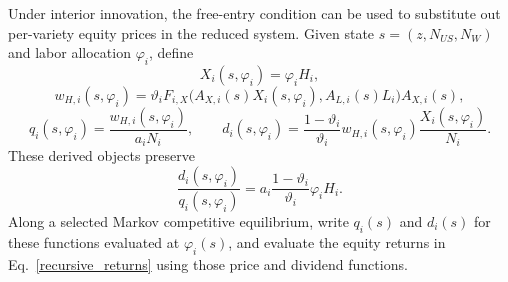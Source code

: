 \documentclass{article}
\begin{document}
Under interior innovation, the free-entry condition can be used to substitute out per-variety equity prices in the reduced system. Given state $s=(z,N_{US},N_W)$ and labor allocation $\varphi_i$, define
\[
X_i(s,\varphi_i)=\varphi_iH_i,
\]
\[
w_{H,i}(s,\varphi_i)
=
\vartheta_i
F_{i,X}
\bigl(A_{X,i}(s)X_i(s,\varphi_i),A_{L,i}(s)L_i\bigr)
A_{X,i}(s),
\]
\[
q_i(s,\varphi_i)=\frac{w_{H,i}(s,\varphi_i)}{a_iN_i},
\qquad
d_i(s,\varphi_i)
=
\frac{1-\vartheta_i}{\vartheta_i}
w_{H,i}(s,\varphi_i)\frac{X_i(s,\varphi_i)}{N_i}.
\]
These derived objects preserve
\[
\frac{d_i(s,\varphi_i)}{q_i(s,\varphi_i)}
=
a_i\frac{1-\vartheta_i}{\vartheta_i}\varphi_iH_i.
\]
Along a selected Markov competitive equilibrium, write $q_i(s)$ and $d_i(s)$ for these functions evaluated at $\varphi_i(s)$, and evaluate the equity returns in Eq.~\eqref{recursive_returns} using those price and dividend functions.
\end{document}
